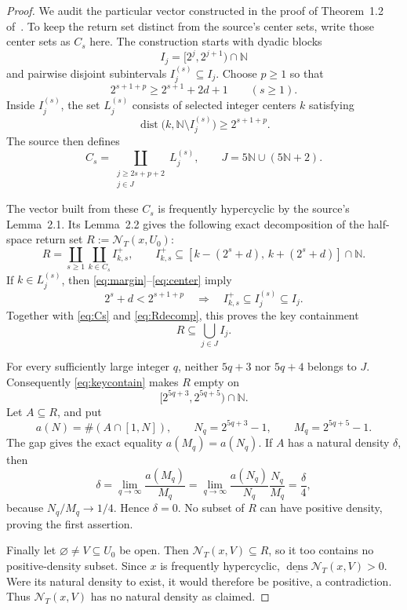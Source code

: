 \documentclass[10pt]{article}
\newcommand{\N}{\mathbb N}
\newcommand{\NT}{\mathcal N_T}
\begin{document}
\begin{proof}
We audit the particular vector constructed in the proof of
Theorem~1.2 of~\cite{Grivaux}.  To keep the return set distinct from the
source's center sets, write those center sets as $C_s$ here.  The construction
starts with dyadic blocks
\[
 I_j=[2^j,2^{j+1})\cap\N
\]
and pairwise disjoint subintervals $I_j^{(s)}\subseteq I_j$.  Choose $p\geq1$
so that
\begin{equation}\label{eq:margin}
 2^{s+1+p}\geq2^{s+1}+2d+1\qquad(s\geq1).
\end{equation}
Inside $I_j^{(s)}$, the set $L_j^{(s)}$ consists of selected integer centers
$k$ satisfying
\begin{equation}\label{eq:center}
 \operatorname{dist}\bigl(k,\N\setminus I_j^{(s)}\bigr)
 \geq2^{s+1+p}.
\end{equation}
The source then defines
\begin{equation}\label{eq:Cs}
 C_s=\coprod_{\substack{j\geq2s+p+2\\j\in J}}L_j^{(s)},
 \qquad J=5\N\cup(5\N+2).
\end{equation}

The vector built from these $C_s$ is frequently hypercyclic by the source's
Lemma~2.1.  Its Lemma~2.2 gives the following exact decomposition of the
half-space return set $R:=\NT(x,U_0)$:
\begin{equation}\label{eq:Rdecomp}
 R=\coprod_{s\geq1}\coprod_{k\in C_s}I_{k,s}^+,
 \qquad
 I_{k,s}^+\subseteq[k-(2^s+d),\,k+(2^s+d)]\cap\N.
\end{equation}
If $k\in L_j^{(s)}$, then \eqref{eq:margin}--\eqref{eq:center} imply
\[
 2^s+d<2^{s+1+p}
 \quad\Longrightarrow\quad
 I_{k,s}^+\subseteq I_j^{(s)}\subseteq I_j.
\]
Together with \eqref{eq:Cs} and \eqref{eq:Rdecomp}, this proves the key
containment
\begin{equation}\label{eq:keycontain}
 R\subseteq\bigcup_{j\in J}I_j.
\end{equation}

For every sufficiently large integer $q$, neither $5q+3$ nor $5q+4$ belongs
to $J$.  Consequently \eqref{eq:keycontain} makes $R$ empty on
\[
 [2^{5q+3},2^{5q+5})\cap\N.
\]
Let $A\subseteq R$, and put
\[
 a(N)=\#(A\cap[1,N]),\qquad
 N_q=2^{5q+3}-1,
 \qquad M_q=2^{5q+5}-1.
\]
The gap gives the exact equality $a(M_q)=a(N_q)$.  If $A$ has a natural
density $\delta$, then
\[
 \delta
 =\lim_{q\to\infty}\frac{a(M_q)}{M_q}
 =\lim_{q\to\infty}
   \frac{a(N_q)}{N_q}\frac{N_q}{M_q}
 =\frac{\delta}{4},
\]
because $N_q/M_q\to1/4$.  Hence $\delta=0$.  No subset of $R$ can have
positive density, proving the first assertion.

Finally let $\varnothing\ne V\subseteq U_0$ be open.  Then
$\NT(x,V)\subseteq R$, so it too contains no positive-density subset.
Since $x$ is frequently hypercyclic,
$\underline{\operatorname{dens}}\NT(x,V)>0$.  Were its natural density to
exist, it would therefore be positive, a contradiction.  Thus
$\NT(x,V)$ has no natural density as claimed.
\end{proof}
\end{document}
